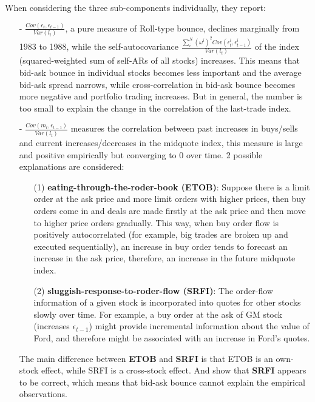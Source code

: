 \begin{enumerate}
    When considering the three sub-components individually, they report: 
    \begin{enumerate}
        \item[-] $\frac{Cov(\epsilon_t,\epsilon_{t-1})}{Var(l_t)}$, a pure measure of Roll-type bounce, declines marginally from 1983 to 1988, while the self-autocovariance $\frac{\sum^N_i(\omega^i)^2Cov(\epsilon_t^i,\epsilon_{t-1}^i)}{Var(l_t)}$
        of the index (squared-weighted sum of self-ARs of all stocks) increases. This means that bid-ask bounce in individual stocks becomes less important and the average bid-ask spread narrows, while cross-correlation in bid-ask bounce becomes more negative and 
        portfolio trading increases. But in general, the number is too small to explain the change in the correlation of the last-trade index.
        \item[-] $\frac{Cov(m_t,\epsilon_{t-1})}{Var(l_t)}$ measures the correlation between past increases in buys/sells and current increases/decreases in the midquote index, this measure is large and positive empirically but converging to 0 over time. 2 possible explanations
        are considered:
        \begin{enumerate}
            \item[(1)] \textbf{eating-through-the-roder-book (ETOB)}: Suppose there is a limit order at the ask price and more limit orders with higher prices, then buy orders come in and deals are made firstly at the ask price and then move to higher price orders gradually.
            This way, when buy order flow is positively autocorrelated (for example, big trades are broken up and executed sequentially), an increase in buy order tends to forecast an increase in the ask price, therefore, an increase in the future midquote index.
            \item[(2)] \textbf{sluggish-response-to-roder-flow (SRFI)}: The order-flow information of a given stock is incorporated into quotes for other stocks slowly over time. For example, a buy order at the ask of GM stock (increases $\epsilon_{t-1}$) might provide incremental information
            about the value of Ford, and therefore might be associated with an increase in Ford's quotes.
        \end{enumerate}  
        The main difference between \textbf{ETOB} and \textbf{SRFI} is that ETOB is an own-stock effect, while SRFI is a cross-stock effect. And \citeauthor{froot1995new} show that \textbf{SRFI} appears to be correct, which means that bid-ask bounce cannot explain the empirical observations.

\end{enumerate}
\end{enumerate}
